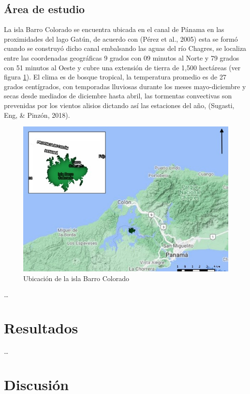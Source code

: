 \documentclass[11pt,]{article}
\begin{document}
\subsection{Área de estudio}\label{uxe1rea-de-estudio}

La isla Barro Colorado se encuentra ubicada en el canal de Pánama en las
proximidades del lago Gatún, de acuerdo con (Pérez et al., 2005) esta se
formó cuando se construyó dicho canal embalsando las aguas del río
Chagres, se localiza entre las coordenadas geográficas 9 grados con 09
minutos al Norte y 79 grados con 51 minutos al Oeste y cubre una
extensión de tierra de 1,500 hectáreas (ver figura \ref{mapa}). El clima
es de bosque tropical, la temperatura promedio es de 27 grados
centígrados, con temporadas lluviosas durante los meses mayo-diciembre y
secas desde mediados de diciembre hasta abril, las tormentas convectivas
son prevenidas por los vientos alisios dictando así las estaciones del
año, (Sugasti, Eng, \& Pinzón, 2018).

\begin{figure}
\centering
\includegraphics{mapa_barro_colorado.jpeg}
\caption{Ubicación de la isla Barro Colorado\label{mapa}}
\end{figure}

\ldots

\section{Resultados}\label{resultados}

\ldots

\section{Discusión}\label{discusiuxf3n}
\end{document}
